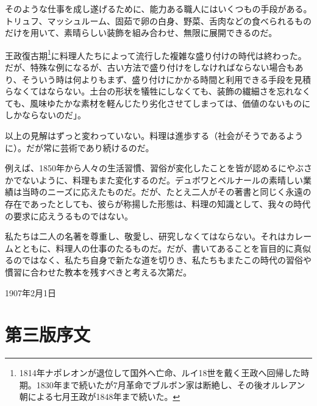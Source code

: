 \begin{main}
そのような仕事を成し遂げるために、能力ある職人にはいくつもの手段がある。トリュフ、マッシュルーム、固茹で卵の白身、野菜、舌肉などの食べられるものだけを用いて、素晴らしい装飾を組み合わせ、無限に展開できるのだ。

王政復古期\footnote{1814年ナポレオンが退位して国外へ亡命、ルイ18世を戴く王政へ回帰した時期。1830年まで続いたが7月革命でブルボン家は断絶し、その後オルレアン朝による七月王政が1848年まで続いた。}に料理人たちによって流行した複雑な盛り付けの時代は終わった。だが、特殊な例になるが、古い方法で盛り付けをしなければならない場合もあり、そういう時は何よりもまず、盛り付けにかかる時間と利用できる手段を見積らなくてはならない。土台の形状を犠牲にしなくても、装飾の繊細さを忘れなくても、風味ゆたかな素材を軽んじたり劣化させてしまっては、価値のないものにしかならないのだ」。

以上の見解はずっと変わっていない。料理は進歩する（社会がそうであるように）。だが常に芸術であり続けるのだ。

例えば、1850年から人々の生活習慣、習俗が変化したことを皆が認めるにやぶさかでないように、料理もまた変化するのだ。デュボワとベルナールの素晴しい業績は当時のニーズに応えたものだ。だが、たとえ二人がその著書と同じく永遠の存在であったとしても、彼らが称揚した形態は、料理の知識として、我々の時代の要求に応えうるものではない。

私たちは二人の名著を尊重し、敬愛し、研究しなくてはならない。それはカレームとともに、料理人の仕事のたるものだ。だが、書いてあることを盲目的に真似るのではなく、私たち自身で新たな道を切りき、私たちもまたこの時代の習俗や慣習に合わせた教本を残すべきと考える次第だ。

\begin{flushright}
1907年2月1日
\end{flushright}

\end{main}

\newpage

\hypertarget{introduction-troisieme-edition}{%
\section{第三版序文}\label{introduction-troisieme-edition}}

